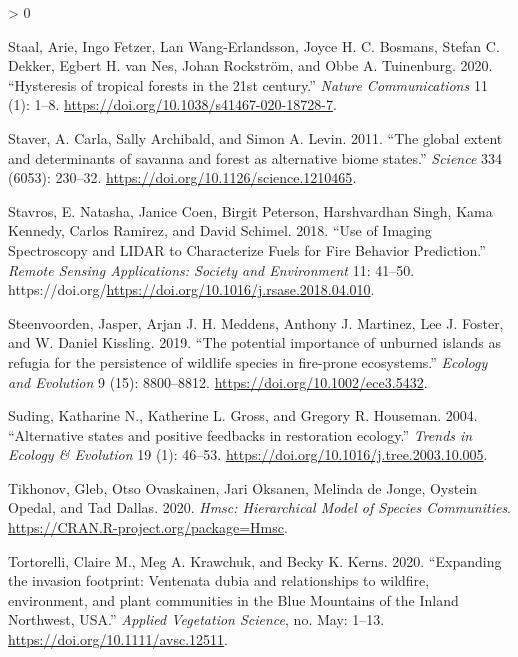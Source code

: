 \documentclass[
  12pt,
]{article}
\newlength{\cslhangindent}
\newenvironment{CSLReferences}[2] %
 {%
  \setlength{\parindent}{0pt}
  \ifodd #1 \everypar{\setlength{\hangindent}{\cslhangindent}}\ignorespaces\fi
  \ifnum #2 > 0
  \setlength{\parskip}{#2\baselineskip}
  \fi
 }%
 {}
\begin{document}
\begin{CSLReferences}{1}{0}
\leavevmode\hypertarget{ref-Staal2020}{}%
Staal, Arie, Ingo Fetzer, Lan Wang-Erlandsson, Joyce H. C. Bosmans,
Stefan C. Dekker, Egbert H. van Nes, Johan Rockström, and Obbe A.
Tuinenburg. 2020. {``{Hysteresis of tropical forests in the 21st
century}.''} \emph{Nature Communications} 11 (1): 1--8.
\url{https://doi.org/10.1038/s41467-020-18728-7}.

\leavevmode\hypertarget{ref-Staver2011}{}%
Staver, A. Carla, Sally Archibald, and Simon A. Levin. 2011. {``{The
global extent and determinants of savanna and forest as alternative
biome states}.''} \emph{Science} 334 (6053): 230--32.
\url{https://doi.org/10.1126/science.1210465}.

\leavevmode\hypertarget{ref-Stavros2018}{}%
Stavros, E. Natasha, Janice Coen, Birgit Peterson, Harshvardhan Singh,
Kama Kennedy, Carlos Ramirez, and David Schimel. 2018. {``Use of Imaging
Spectroscopy and {LIDAR} to Characterize Fuels for Fire Behavior
Prediction.''} \emph{Remote Sensing Applications: Society and
Environment} 11: 41--50.
https://doi.org/\url{https://doi.org/10.1016/j.rsase.2018.04.010}.

\leavevmode\hypertarget{ref-Steenvoorden2019}{}%
Steenvoorden, Jasper, Arjan J. H. Meddens, Anthony J. Martinez, Lee J.
Foster, and W. Daniel Kissling. 2019. {``{The potential importance of
unburned islands as refugia for the persistence of wildlife species in
fire-prone ecosystems}.''} \emph{Ecology and Evolution} 9 (15):
8800--8812. \url{https://doi.org/10.1002/ece3.5432}.

\leavevmode\hypertarget{ref-Suding2004}{}%
Suding, Katharine N., Katherine L. Gross, and Gregory R. Houseman. 2004.
{``{Alternative states and positive feedbacks in restoration
ecology}.''} \emph{Trends in Ecology \& Evolution} 19 (1): 46--53.
\url{https://doi.org/10.1016/j.tree.2003.10.005}.

\leavevmode\hypertarget{ref-HMSC}{}%
Tikhonov, Gleb, Otso Ovaskainen, Jari Oksanen, Melinda de Jonge, Oystein
Opedal, and Tad Dallas. 2020. \emph{Hmsc: Hierarchical Model of Species
Communities}. \url{https://CRAN.R-project.org/package=Hmsc}.

\leavevmode\hypertarget{ref-Tortorelli2020}{}%
Tortorelli, Claire M., Meg A. Krawchuk, and Becky K. Kerns. 2020.
{``{Expanding the invasion footprint: Ventenata dubia and relationships
to wildfire, environment, and plant communities in the Blue Mountains of
the Inland Northwest, USA}.''} \emph{Applied Vegetation Science}, no.
May: 1--13. \url{https://doi.org/10.1111/avsc.12511}.


\end{CSLReferences}
\end{document}
